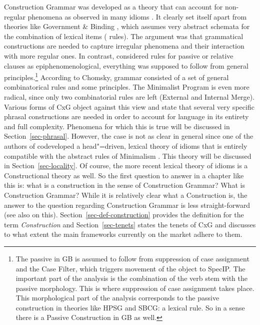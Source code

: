 \documentclass[output=paper]{langsci/langscibook}
\begin{document}
Construction Grammar was developed as a theory that can account for non-regular phenomena as observed
in many idioms \citep*{FKoC88a}. It clearly set itself apart from theories like Government \& Binding
\citep{Chomsky81a}, which assumes very abstract schemata for the combination of lexical items (\xbar
rules). The argument was that grammatical constructions are needed to capture irregular phenomena
and their interaction with more regular ones. In contrast, \citet[]{Chomsky81a} considered
rules for passive or relative clauses as epiphenomenological, everything was supposed to follow from
general principles.\footnote{
  The passive in GB is assumed to follow from suppression of case assignment and the Case Filter,
  which triggers movement of the object to SpecIP. The important part of the analysis is the combination of the verb stem
  with the passive morphology. This is where suppression of case assignment takes place. This
  morphological part of the analysis corresponds to the passive construction in theories like HPSG
  and SBCG: a lexical rule. So in a sense there is a Passive Construction in GB as well.%
} According to Chomsky, grammar consisted of a set of general combinatorical rules
and some principles. The Minimalist Program \citep{Chomsky95a-u} is even more radical, since only two combinatorial rules
are left (External and Internal Merge). Various forms of CxG object against this view and state that
several very specific phrasal constructions are needed in order to account for language in its
entirety and full complexity. Phenomena for which this is true will be discussed in
Section~\ref{sec-phrasal}. However, the case is not as clear in general since one of the authors of
\citet*{FKoC88a} codeveloped a head"=driven, lexical theory of idioms that is entirely compatible with the abstract rules of
Minimalism \citep*{Sag2007a,KSF2015a,KM2017a}. This theory will be discussed in
Section~\ref{sec-locality}. Of course, the more recent lexical theory of idioms is a Constructional
theory as well. So the first question to answer in a chapter like this is: what is a construction in
the sense of Construction Grammar? What is Construction Grammar? While it is
relatively clear what a Construction is, the answer to the question regarding Construction Grammar
is less straight-forward (see also \citealt[]{Fillmore88a} on this). Section~\ref{sec-def-construction} provides the definition for the term
\emph{Construction} and Section~\ref{sec-tenets} states the tenets of CxG and discusses to what
extent the main frameworks currently on the market adhere to them.
\end{document}
